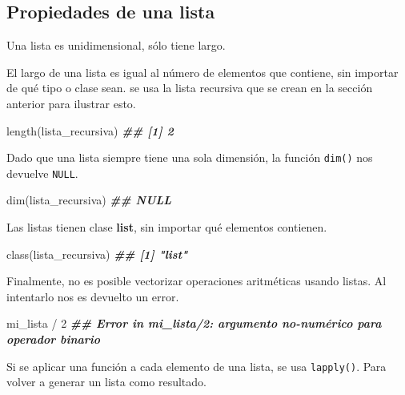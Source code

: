 \documentclass[
]{book}
\newenvironment{Shaded}{\begin{snugshade}}{\end{snugshade}}
\newcommand{\DecValTok}[1]{\textcolor[rgb]{0.00,0.00,0.81}{#1}}
\newcommand{\DocumentationTok}[1]{\textcolor[rgb]{0.56,0.35,0.01}{\textbf{\textit{#1}}}}
\newcommand{\FunctionTok}[1]{\textcolor[rgb]{0.00,0.00,0.00}{#1}}
\newcommand{\NormalTok}[1]{#1}
\newcommand{\SpecialCharTok}[1]{\textcolor[rgb]{0.00,0.00,0.00}{#1}}
\begin{document}
\hypertarget{propiedades-de-una-lista}{%
\subsection{Propiedades de una lista}\label{propiedades-de-una-lista}}

Una lista es unidimensional, sólo tiene largo.

El largo de una lista es igual al número de elementos que contiene, sin importar de qué tipo o clase sean. se usa la lista recursiva que se crean en la sección anterior para ilustrar esto.

\begin{Shaded}
\begin{Highlighting}[]
\FunctionTok{length}\NormalTok{(lista\_recursiva)}
\DocumentationTok{\#\# [1] 2}
\end{Highlighting}
\end{Shaded}

Dado que una lista siempre tiene una sola dimensión, la función \texttt{dim()} nos devuelve \texttt{NULL}.

\begin{Shaded}
\begin{Highlighting}[]
\FunctionTok{dim}\NormalTok{(lista\_recursiva)}
\DocumentationTok{\#\# NULL}
\end{Highlighting}
\end{Shaded}

Las listas tienen clase \textbf{list}, sin importar qué elementos contienen.

\begin{Shaded}
\begin{Highlighting}[]
\FunctionTok{class}\NormalTok{(lista\_recursiva)}
\DocumentationTok{\#\# [1] "list"}
\end{Highlighting}
\end{Shaded}

Finalmente, no es posible vectorizar operaciones aritméticas usando listas. Al intentarlo nos es devuelto un error.

\begin{Shaded}
\begin{Highlighting}[]
\NormalTok{mi\_lista }\SpecialCharTok{/} \DecValTok{2}
\DocumentationTok{\#\# Error in mi\_lista/2: argumento no{-}numérico para operador binario}
\end{Highlighting}
\end{Shaded}

Si se aplicar una función a cada elemento de una lista, se usa \texttt{lapply()}. Para volver a generar un lista como resultado.
\end{document}
